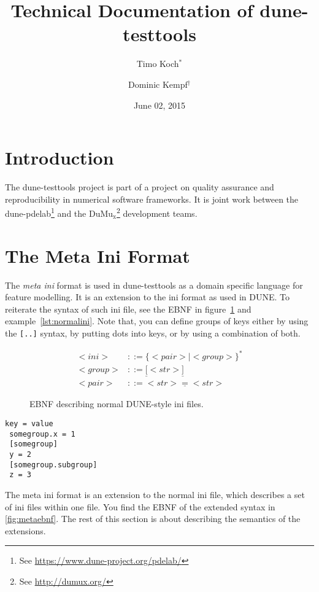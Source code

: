 \documentclass[11pt]{article}
\title{Technical Documentation of \textbf{dune-testtools}}
\author{
Timo Koch$^\ast$ \and
Dominic Kempf$^\dagger$
}
\date{June 02, 2015}
\begin{document}
\maketitle
\tableofcontents
\pagebreak

\section{Introduction}

The dune-testtools project is part of a project on quality assurance and reproducibility in numerical software frameworks. It is joint work between the dune-pdelab\footnote{See \url{https://www.dune-project.org/pdelab/}} and the DuMu$_\textrm{x}$\footnote{See \url{http://dumux.org/}} development teams.

\section{The Meta Ini Format}

The \emph{meta ini} format is used in dune-testtools as a domain specific language for feature modelling. It is an extension to the ini format as used in DUNE. To reiterate the syntax of such ini file, see the EBNF in figure~\ref{fig:normalebnf} and example~\ref{lst:normalini}. Note that, you can define groups of keys either by using the \lstinline![..]! syntax, by putting dots into keys, or by using a combination of both.

\begin{figure}
\begin{align*}
 <ini> & ::= \{<pair> | <group>\}^* \\
 <group> & ::= \underline{[}<str>\underline{]} \\
 <pair> & ::= <str>\underline{ = }<str>
\end{align*}
\caption{EBNF describing normal DUNE-style ini files.}
\label{fig:normalebnf}
\end{figure}

\begin{lstlisting}[caption={A normal DUNE-style ini file},label=lst:normalini]
 key = value
 somegroup.x = 1
 [somegroup]
 y = 2
 [somegroup.subgroup]
 z = 3
\end{lstlisting}

The meta ini format is an extension to the normal ini file, which describes a set of ini files within one file. You find the EBNF of the extended syntax in \ref{fig:metaebnf}. The rest of this section is about describing the semantics of the extensions.
\end{document}
